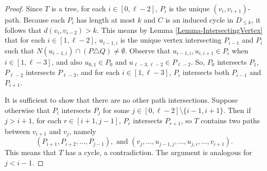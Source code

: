 \documentclass[12pt]{article}
\theoremstyle{definition}
\begin{document}
	\begin{proof}
		
		
		Since $T$ is a tree, for each $i \in [0,\ell-2]$, $P_i$ is the unique $(v_i,v_{i+1})$-path.  Because each $P_i$ has length at most $k$ and $C$ is an induced cycle in $D_{\leq k}$, it follows that $d(v_i,v_{i-2}) > k$.  This means by Lemma \ref{Lemma-IntersectingVertex} that for each $i \in [1,\ell-2]$, $u_{i-1,i}$ is the unique vertex intersecting $P_{i-1}$ and $P_i$ such that $N(u_{i-1,i}) \cap (P \triangle Q) \neq \emptyset$.   Observe that $u_{i-1,i}, u_{i,i+1} \in P_{i}$ when $i \in [1,\ell-3]$, and also $u_{0,1} \in P_0$ and $u_{\ell-3,\ell-2} \in P_{\ell-2}$.  So, $P_0$ intersects $P_1$, $P_{\ell-2}$ intersects $P_{\ell-3}$, and for each $i \in [1,\ell-3]$, $P_i$ intersects both $P_{i-1}$ and $P_{i+1}$.%
		
		
		It is sufficient to show that there are no other path intersections.  %
		Suppose otherwise that $P_i$ intersects $P_j$ for some $j \in [0,\ell-2] \setminus \{i-1,i+1\}$.  Then if $j > i+1$, for each $r \in [i+1,j-1]$, $P_r$ intersects $P_{r+1}$, so $T$ contains two paths between $v_{i+1}$ and $v_j$, namely $$(P_{i+1}, P_{i+2}, \ldots, P_{j-1}), \text{ and } (v_j, \ldots, u_{j-1,j}, \ldots, u_{j,i}, \ldots, v_{i+1}).$$
		This means that $T$ has a cycle, a contradiction.  The argument is analogous for $j < i-1$. \qedhere
		
	\end{proof}
	
\end{document}

